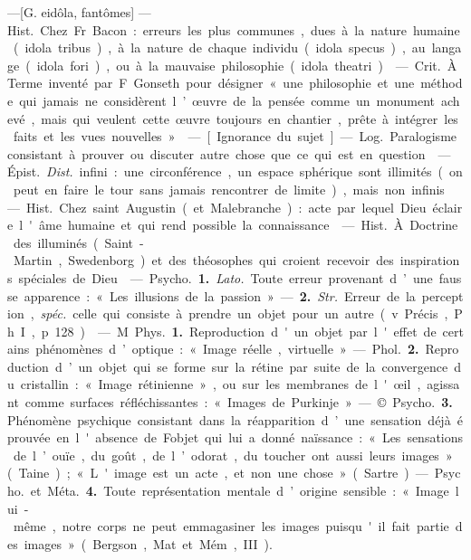 \begin{itemize}[leftmargin=1cm, label=, itemsep=1pt]
 —[G. eidôla, fantômes] — \si{Hist.}
Chez Fr. Bacon : erreurs les plus
communes, dues à la nature humaine (idola tribus), à la nature de
chaque individu (idola specus), au
langage (idola fori), ou à la mauvaise
philosophie (idola theatri).

 — \si{Crit.} À. Terme inventé
par F. Gonseth pour désigner « une
philosophie et une méthode qui
jamais ne considèrent l’œuvre de la
pensée comme un monument achevé,
mais qui veulent cette œuvre toujours en chantier, prête à intégrer
les faits et les vues nouvelles ».

 — [Ignorance du sujet]
— \si{Log.} Paralogisme consistant à
prouver ou discuter autre chose que
ce qui est en question.

 — \si{Épist.} {\it Dist.} infini : une
circonférence, un espace sphérique
sont illimités (on peut en faire le
tour sans jamais rencontrer de
limite), mais non infinis.

 — \si{Hist.} Chez saint Augustin (et Malebranche) : acte par
lequel Dieu éclaire l'âme humaine
et qui rend possible la connaissance.

 — \si{Hist.} À. Doctrine des
illuminés (Saint-Martin, Swedenborg) et des théosophes qui croient
recevoir des inspirations spéciales
de Dieu.

 — \si{Psycho.} {\bf 1.} {\it Lato.} Toute
erreur provenant d’une fausse apparence : « Les illusions de la passion ».
— {\bf 2.} {\it Str.} Erreur de la perception,
{\it spéc.} celle qui consiste à prendre un
objet pour un autre (v. Précis,
Ph. I, p. 128).

 — M \si{Phys.} {\bf 1.} Reproduction
d'un objet par l'effet de certains
phénomènes d’optique : « Image
réelle, virtuelle ». — \si{Phol.} {\bf 2.} Reproduction d’un objet qui se forme sur
la rétine par suite de la convergence
du cristallin : « Image rétinienne »,
ou sur les membranes de l'œil, agissant comme surfaces réfléchissantes :
« Images de Purkinje ».

— © \si{Psycho.} {\bf 3.} Phénomène psychique consistant dans la réapparition d’une sensation déjà éprouvée
en l'absence de Fobjet qui lui a
donné naïssance : « Les sensations
de l’ouïe, du goût, de l’odorat, du
toucher ont aussi leurs images »
(Taine); « L'image est un acte, et
non une chose » (Sartre). — \si{Psycho.}
et \si{Méta.} {\bf 4.} Toute représentation
mentale d’origine sensible : « Image
lui-même, notre corps ne peut emmagasiner les images puisqu'il fait
partie des images » (Bergson, Mat.
et Mém, III).


\end{itemize}
